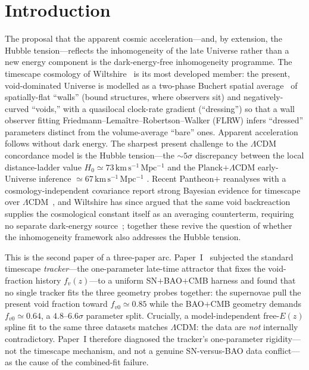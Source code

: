 \documentclass[aps,prd,twocolumn,nofootinbib,superscriptaddress,floatfix]{revtex4-2}
\newcommand{\Ho}{H_{0}}
\newcommand{\fvo}{f_{v0}}
\newcommand{\fvz}{f_{v}(z)}
\newcommand{\kmsmpc}{\,\mathrm{km\,s^{-1}\,Mpc^{-1}}}
\newcommand{\Lcdm}{\Lambda\mathrm{CDM}}
\begin{document}
\maketitle

\section{Introduction}
\label{sec:intro}

The proposal that the apparent cosmic acceleration---and, by extension, the
Hubble tension---reflects the inhomogeneity of the late Universe rather than a
new energy component is the dark-energy-free inhomogeneity programme. The
timescape cosmology of Wiltshire~\cite{Wiltshire2007,Wiltshire2009,Wiltshire2009review}
is its most developed member: the present, void-dominated Universe is modelled as
a two-phase Buchert spatial average~\cite{Buchert2000,WiegandBuchert2010} of
spatially-flat ``walls'' (bound structures, where observers sit) and
negatively-curved ``voids,'' with a quasilocal clock-rate gradient (``dressing'')
so that a wall observer fitting Friedmann--Lema\^itre--Robertson--Walker (FLRW)
infers ``dressed'' parameters distinct from the volume-average ``bare'' ones.
Apparent acceleration follows without dark energy. The sharpest present challenge
to the $\Lcdm$ concordance model is the Hubble tension---the $\sim\!5\sigma$
discrepancy between the local distance-ladder value $\Ho\simeq73\kmsmpc$ and the
Planck$+\Lcdm$ early-Universe inference $\simeq67\kmsmpc$
\cite{Verde2023,Kamionkowski2022,CosmoVerse2025}. Recent Pantheon$+$ reanalyses
with a cosmology-independent covariance report strong Bayesian evidence for
timescape over $\Lcdm$~\cite{Lane2025,Seifert2024}, and Wiltshire has since argued
that the same void backreaction supplies the cosmological constant itself as an
averaging counterterm, requiring no separate dark-energy source~\cite{Wiltshire2024};
together these revive the question of whether the inhomogeneity framework also
addresses the Hubble tension.

This is the second paper of a three-paper arc. Paper~I~\cite{Paper1} subjected
the standard timescape \emph{tracker}---the one-parameter late-time attractor
that fixes the void-fraction history $\fvz$---to a uniform SN$+$BAO$+$CMB
harness and found that no single tracker fits the three geometry probes together:
the supernovae pull the present void fraction toward $\fvo\simeq0.85$ while the
BAO$+$CMB geometry demands $\fvo\simeq0.64$, a $4.8$--$6.6\sigma$ parameter split.
Crucially, a model-independent free-$E(z)$ spline fit to the same three datasets
matches $\Lcdm$: the data are \emph{not} internally contradictory. Paper~I
therefore diagnosed the tracker's one-parameter rigidity---not the timescape
mechanism, and not a genuine SN-versus-BAO data conflict---as the cause of the
combined-fit failure.
\end{document}
